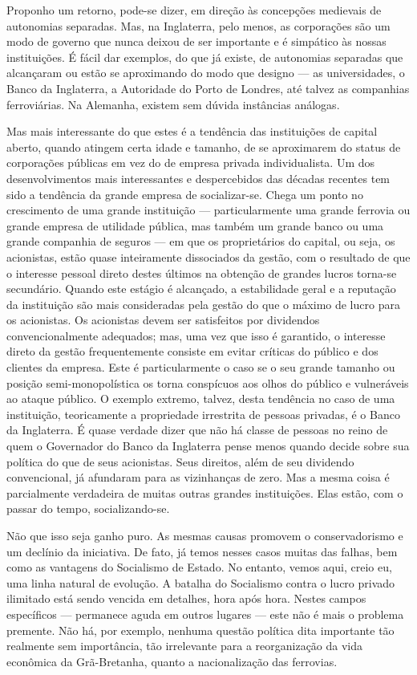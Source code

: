 \documentclass[12pt]{article}
\begin{document}
Proponho um retorno, pode-se dizer, em direção às concepções medievais de autonomias separadas. Mas, na Inglaterra, pelo menos, as corporações são um modo de governo que nunca deixou de ser importante e é simpático às nossas instituições. É fácil dar exemplos, do que já existe, de autonomias separadas que alcançaram ou estão se aproximando do modo que designo — as universidades, o Banco da Inglaterra, a Autoridade do Porto de Londres, até talvez as companhias ferroviárias. Na Alemanha, existem sem dúvida instâncias análogas.

Mas mais interessante do que estes é a tendência das instituições de capital aberto, quando atingem certa idade e tamanho, de se aproximarem do status de corporações públicas em vez do de empresa privada individualista. Um dos desenvolvimentos mais interessantes e despercebidos das décadas recentes tem sido a tendência da grande empresa de socializar-se. Chega um ponto no crescimento de uma grande instituição — particularmente uma grande ferrovia ou grande empresa de utilidade pública, mas também um grande banco ou uma grande companhia de seguros — em que os proprietários do capital, ou seja, os acionistas, estão quase inteiramente dissociados da gestão, com o resultado de que o interesse pessoal direto destes últimos na obtenção de grandes lucros torna-se secundário. Quando este estágio é alcançado, a estabilidade geral e a reputação da instituição são mais consideradas pela gestão do que o máximo de lucro para os acionistas. Os acionistas devem ser satisfeitos por dividendos convencionalmente adequados; mas, uma vez que isso é garantido, o interesse direto da gestão frequentemente consiste em evitar críticas do público e dos clientes da empresa. Este é particularmente o caso se o seu grande tamanho ou posição semi-monopolística os torna conspícuos aos olhos do público e vulneráveis ao ataque público. O exemplo extremo, talvez, desta tendência no caso de uma instituição, teoricamente a propriedade irrestrita de pessoas privadas, é o Banco da Inglaterra. É quase verdade dizer que não há classe de pessoas no reino de quem o Governador do Banco da Inglaterra pense menos quando decide sobre sua política do que de seus acionistas. Seus direitos, além de seu dividendo convencional, já afundaram para as vizinhanças de zero. Mas a mesma coisa é parcialmente verdadeira de muitas outras grandes instituições. Elas estão, com o passar do tempo, socializando-se.

Não que isso seja ganho puro. As mesmas causas promovem o conservadorismo e um declínio da iniciativa. De fato, já temos nesses casos muitas das falhas, bem como as vantagens do Socialismo de Estado. No entanto, vemos aqui, creio eu, uma linha natural de evolução. A batalha do Socialismo contra o lucro privado ilimitado está sendo vencida em detalhes, hora após hora. Nestes campos específicos — permanece aguda em outros lugares — este não é mais o problema premente. Não há, por exemplo, nenhuma questão política dita importante tão realmente sem importância, tão irrelevante para a reorganização da vida econômica da Grã-Bretanha, quanto a nacionalização das ferrovias.
\end{document}
